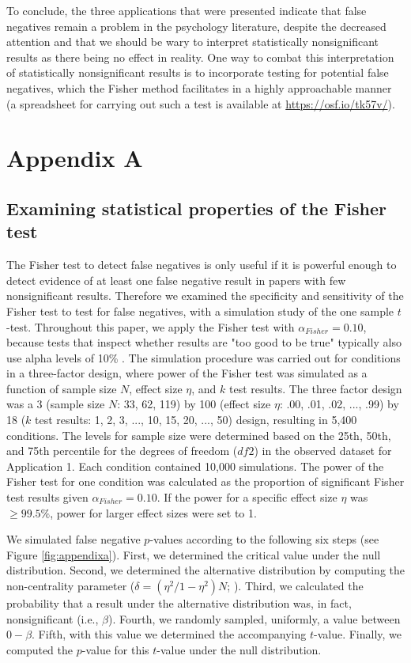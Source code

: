 \documentclass{article}
\begin{document}
To conclude, the three applications that were presented indicate that false negatives remain a problem in the psychology literature, despite the decreased attention and that we should be wary to interpret statistically nonsignificant results as there being no effect in reality. One way to combat this interpretation of statistically nonsignificant results is to incorporate testing for potential false negatives, which the Fisher method facilitates in a highly approachable manner  (a spreadsheet for carrying out such a test is available at \url{https://osf.io/tk57v/}).

\section*{Appendix A}
\subsection*{Examining statistical properties of the Fisher test}
The Fisher test to detect false negatives is only useful if it is powerful enough to detect evidence of at least one false negative result in papers with few nonsignificant results. Therefore we examined the specificity and sensitivity of the Fisher test to test for false negatives, with a simulation study of the one sample $t$-test. Throughout this paper, we apply the Fisher test with $\alpha_{Fisher}=0.10$, because tests that inspect whether results are "too good to be true" typically also use alpha levels of 10\% \cite{Sterne2000-wh,Ioannidis2007-hh,Francis2012-kw}. The simulation procedure was carried out for conditions in a three-factor design, where power of the Fisher test was simulated as a function of sample size $N$, effect size $\eta$, and $k$ test results. The three factor design was a 3 (sample size $N$: 33, 62, 119) by 100 (effect size $\eta$: .00, .01, .02, ..., .99) by 18 ($k$ test results: 1, 2, 3, ..., 10, 15, 20, ..., 50) design, resulting in 5,400 conditions. The levels for sample size were determined based on the 25th, 50th, and 75th percentile for the degrees of freedom ($df2$) in the observed dataset for Application 1. Each condition contained 10,000 simulations. The power of the Fisher test for one condition was calculated as the proportion of significant Fisher test results given $\alpha_{Fisher}=0.10$. If the power for a specific effect size $\eta$ was $\geq99.5\%$, power for larger effect sizes were set to 1.

We simulated false negative $p$-values according to the following six steps (see Figure \ref{fig:appendixa}). First, we determined the critical value under the null distribution. Second, we determined the alternative distribution by computing the non-centrality parameter ($\delta=(\eta^2/1-\eta^2)N$; \cite{Steiger1997-qq,Smithson2001-aw}). Third, we calculated the probability that a result under the alternative distribution was, in fact, nonsignificant (i.e., $\beta$). Fourth, we randomly sampled, uniformly, a value between $0-\beta$. Fifth, with this value we determined the accompanying $t$-value. Finally, we computed the $p$-value for this $t$-value under the null distribution. 
\end{document}
